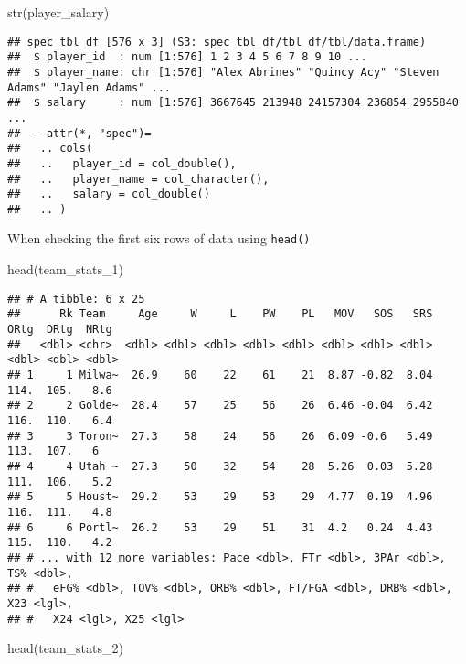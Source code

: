 \documentclass[
]{article}
\newenvironment{Shaded}{\begin{snugshade}}{\end{snugshade}}
\newcommand{\FunctionTok}[1]{\textcolor[rgb]{0.00,0.00,0.00}{#1}}
\newcommand{\NormalTok}[1]{#1}
\begin{document}
\begin{Shaded}
\begin{Highlighting}[]
\FunctionTok{str}\NormalTok{(player\_salary)}
\end{Highlighting}
\end{Shaded}

\begin{verbatim}
## spec_tbl_df [576 x 3] (S3: spec_tbl_df/tbl_df/tbl/data.frame)
##  $ player_id  : num [1:576] 1 2 3 4 5 6 7 8 9 10 ...
##  $ player_name: chr [1:576] "Alex Abrines" "Quincy Acy" "Steven Adams" "Jaylen Adams" ...
##  $ salary     : num [1:576] 3667645 213948 24157304 236854 2955840 ...
##  - attr(*, "spec")=
##   .. cols(
##   ..   player_id = col_double(),
##   ..   player_name = col_character(),
##   ..   salary = col_double()
##   .. )
\end{verbatim}

When checking the first six rows of data using \texttt{head()}

\begin{Shaded}
\begin{Highlighting}[]
\FunctionTok{head}\NormalTok{(team\_stats\_1)}
\end{Highlighting}
\end{Shaded}

\begin{verbatim}
## # A tibble: 6 x 25
##      Rk Team     Age     W     L    PW    PL   MOV   SOS   SRS  ORtg  DRtg  NRtg
##   <dbl> <chr>  <dbl> <dbl> <dbl> <dbl> <dbl> <dbl> <dbl> <dbl> <dbl> <dbl> <dbl>
## 1     1 Milwa~  26.9    60    22    61    21  8.87 -0.82  8.04  114.  105.   8.6
## 2     2 Golde~  28.4    57    25    56    26  6.46 -0.04  6.42  116.  110.   6.4
## 3     3 Toron~  27.3    58    24    56    26  6.09 -0.6   5.49  113.  107.   6  
## 4     4 Utah ~  27.3    50    32    54    28  5.26  0.03  5.28  111.  106.   5.2
## 5     5 Houst~  29.2    53    29    53    29  4.77  0.19  4.96  116.  111.   4.8
## 6     6 Portl~  26.2    53    29    51    31  4.2   0.24  4.43  115.  110.   4.2
## # ... with 12 more variables: Pace <dbl>, FTr <dbl>, 3PAr <dbl>, TS% <dbl>,
## #   eFG% <dbl>, TOV% <dbl>, ORB% <dbl>, FT/FGA <dbl>, DRB% <dbl>, X23 <lgl>,
## #   X24 <lgl>, X25 <lgl>
\end{verbatim}

\begin{Shaded}
\begin{Highlighting}[]
\FunctionTok{head}\NormalTok{(team\_stats\_2)}
\end{Highlighting}
\end{Shaded}
\end{document}

